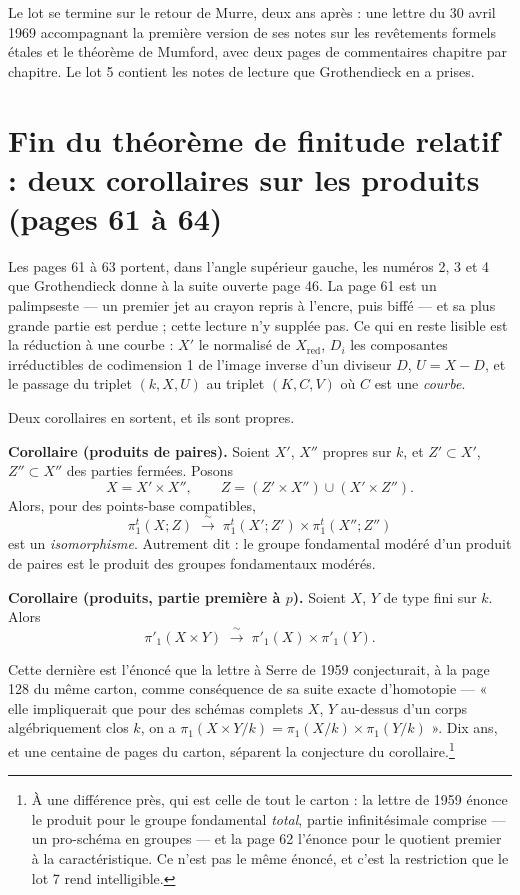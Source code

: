 \documentclass[11pt,a4paper]{article}
\begin{document}
\begin{resume}
Le lot se termine sur le retour de Murre, deux ans après : une lettre du 30
avril 1969 accompagnant la première version de ses notes sur les revêtements
formels étales et le théorème de Mumford, avec deux pages de commentaires
chapitre par chapitre. Le lot 5 contient les notes de lecture que
Grothendieck en a prises.

\end{resume}

\section*{Fin du théorème de finitude relatif : deux corollaires sur les produits (pages 61 à 64)}

Les pages 61 à 63 portent, dans l'angle supérieur gauche, les numéros 2, 3 et 4
que Grothendieck donne à la suite ouverte page 46. La page 61 est un
palimpseste --- un premier jet au crayon repris à l'encre, puis biffé --- et sa
plus grande partie est perdue ; cette lecture n'y supplée pas. Ce qui en reste
lisible est la réduction à une courbe : $X'$ le normalisé de $X_{\mathrm{red}}$,
$D_{i}$ les composantes irréductibles de codimension 1 de l'image inverse d'un
diviseur $D$, $U = X - D$, et le passage du triplet $(k, X, U)$ au triplet
$(K, C, V)$ où $C$ est une \emph{courbe}.

Deux corollaires en sortent, et ils sont propres.

\textbf{Corollaire (produits de paires).} Soient $X'$, $X''$ propres sur $k$,
et $Z' \subset X'$, $Z'' \subset X''$ des parties fermées. Posons
\[
  X = X' \times X'' , \qquad
  Z = (Z' \times X'') \cup (X' \times Z'') .
\]
Alors, pour des points-base compatibles,
\[
  \pi^{t}_{1}(X ; Z) \;\xrightarrow{\ \sim\ }\;
  \pi^{t}_{1}(X' ; Z') \times \pi^{t}_{1}(X'' ; Z'')
\]
est un \emph{isomorphisme}. Autrement dit : le groupe fondamental modéré d'un
produit de paires est le produit des groupes fondamentaux modérés.

\textbf{Corollaire (produits, partie première à $p$).} Soient $X$, $Y$ de type
fini sur $k$. Alors
\[
  \pi'_{1}(X \times Y) \;\xrightarrow{\ \sim\ }\;
  \pi'_{1}(X) \times \pi'_{1}(Y) .
\]

Cette dernière est l'énoncé que la lettre à Serre de 1959 conjecturait, à la
page 128 du même carton, comme conséquence de sa suite exacte d'homotopie ---
« elle impliquerait que pour des schémas complets $X$, $Y$ au-dessus d'un
corps algébriquement clos $k$, on a
$\pi_{1}(X\times Y/k) = \pi_{1}(X/k)\times\pi_{1}(Y/k)$ ». Dix ans, et une
centaine de pages du carton, séparent la conjecture du
corollaire.\footnote{À une différence près, qui est celle de tout le carton :
la lettre de 1959 énonce le produit pour le groupe fondamental \emph{total},
partie infinitésimale comprise --- un pro-schéma en groupes --- et la page 62
l'énonce pour le quotient premier à la caractéristique. Ce n'est pas le même
énoncé, et c'est la restriction que le lot 7 rend intelligible.}
\end{document}
